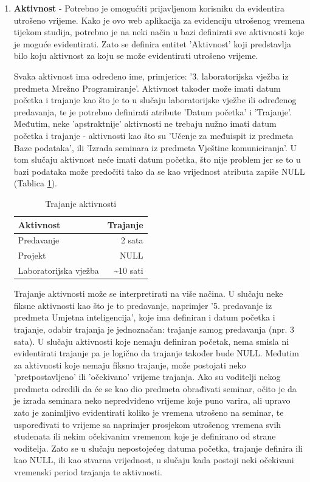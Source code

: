 \documentclass[times, utf8, zavrsni]{fer}
\begin{document}
\begin{enumerate}[leftmargin=*]
\item \textbf{Aktivnost} - 
Potrebno je omogućiti prijavljenom korisniku da evidentira utrošeno vrijeme. Kako je ovo web aplikacija za evidenciju utrošenog vremena tijekom studija, potrebno je na neki način u bazi definirati sve aktivnosti koje je moguće evidentirati. Zato se definira entitet 'Aktivnost' koji predstavlja bilo koju aktivnost za koju se može evidentirati utrošeno vrijeme.

Svaka aktivnost ima određeno ime, primjerice: '3. laboratorijska vježba iz predmeta Mrežno Programiranje'. Aktivnost također može imati datum početka i trajanje kao što je to u slučaju laboratorijske vježbe ili određenog predavanja, te je potrebno definirati atribute 'Datum početka' i 'Trajanje'. Međutim, neke 'apstraktnije' aktivnosti ne trebaju nužno imati datum početka i trajanje - aktivnosti kao što su 'Učenje za međuispit iz predmeta Baze podataka', ili 'Izrada seminara iz predmeta Vještine komuniciranja'. U tom slučaju aktivnost neće imati datum početka, što nije problem jer se to u bazi podataka može predočiti tako da se kao vrijednost atributa zapiše NULL (Tablica \ref{tbl:tablica-trajanje}).

\begin{table}[H]
\caption{Trajanje aktivnosti}
\label{tbl:tablica-trajanje}
\centering
\begin{tabular}{lr} \hline
Aktivnost & Trajanje\\ \hline
Predavanje & 2 sata\\ 
Projekt & NULL\\
Laboratorijska vježba & \textasciitilde10 sati\\
\end{tabular}
\end{table}

Trajanje aktivnosti može se interpretirati na više načina. U slučaju neke fiksne aktivnosti kao što je to predavanje, naprimjer '5. predavanje iz predmeta Umjetna inteligencija', koje ima definiran i datum početka i trajanje, odabir trajanja je jednoznačan: trajanje samog predavanja (npr. 3 sata). U slučaju aktivnosti koje nemaju definiran početak, nema smisla ni evidentirati trajanje pa je logično da trajanje također bude NULL. Međutim za aktivnosti koje nemaju fiksno trajanje, može postojati neko 'pretpostavljeno' ili 'očekivano' vrijeme trajanja. Ako su voditelji nekog predmeta odredili da će se kao dio predmeta obrađivati seminar, očito je da je izrada seminara neko nepredviđeno vrijeme koje puno varira, ali upravo zato je zanimljivo evidentirati koliko je vremena utrošeno na seminar, te uspoređivati to vrijeme sa naprimjer prosjekom utrošenog vremena svih studenata ili nekim očekivanim vremenom koje je definirano od strane voditelja. Zato se u slučaju nepostojećeg datuma početka, trajanje definira ili kao NULL, ili kao stvarna vrijednost, u slučaju kada postoji neki očekivani vremenski period trajanja te aktivnosti.


\end{enumerate}
\end{document}
